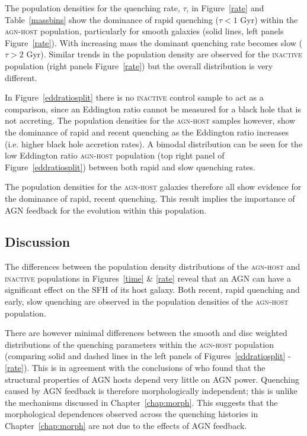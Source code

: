 The population densities for the quenching rate, $\tau$, in Figure~\ref{rate} and Table~\ref{massbins} show the dominance of rapid quenching ($\tau < 1$ Gyr) within the \textsc{agn-host} population, particularly for smooth galaxies (solid lines, left panels Figure~\ref{rate}). With increasing mass the dominant quenching rate becomes slow ($\tau > 2$ Gyr). Similar trends in the population density are observed for the \textsc{inactive} population (right panels Figure~\ref{rate}) but the overall distribution is very different. 

In Figure~\ref{eddratiosplit} there is no \textsc{inactive} control sample to act as a comparison, since an Eddington ratio cannot be measured for a black hole that is not accreting. The population densities for the \textsc{agn-host} samples however, show the dominance of rapid and recent quenching as the Eddington ratio increases (i.e. higher black hole accretion rates). A bimodal distribution can be seen for the low Eddington ratio \textsc{agn-host} population (top right panel of Figure~\ref{eddratiosplit}) between both rapid and slow quenching rates. 

The population densities for the \textsc{agn-host} galaxies therefore all show evidence for the dominance of rapid, recent quenching. This result implies the importance of AGN feedback for the evolution within this population.

\subsection{Discussion}\label{sec:agndis}

The differences between the population density distributions of the \textsc{agn-host} and \textsc{inactive} populations in Figures~\ref{time} \& \ref{rate} reveal that an AGN can have a significant effect on the SFH of its host galaxy. Both recent, rapid quenching and early, slow quenching are observed in the population densities of the \textsc{agn-host} population. 

There are however minimal differences between the smooth and disc weighted distributions of the quenching parameters within the \textsc{agn-host} population (comparing solid and dashed lines in the left panels of Figures~\ref{eddratiosplit} - \ref{rate}). This is in agreement with the conclusions of \citet{kauffmann03b} who found that the structural properties of AGN hosts depend very little on AGN power. Quenching caused by AGN feedback is therefore morphologically independent; this is unlike the mechanisms discussed in Chapter~\ref{chap:morph}. This suggests that the morphological dependences observed across the quenching histories in Chapter~\ref{chap:morph} are not due to the effects of AGN feedback. 

